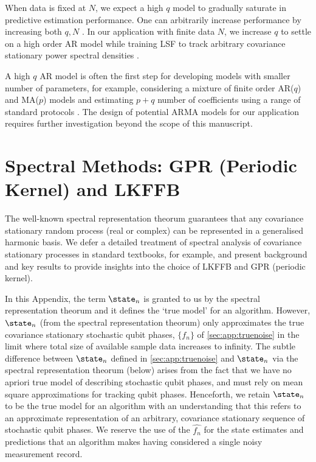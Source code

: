When data is fixed at $N$, we expect a high $q$ model to gradually saturate in predictive estimation performance. One can arbitrarily increase performance by increasing both $q, N$ \cite{wahlberg1989estimation}.  In our application with finite data $N$, we increase $q$ to settle on a high order AR model while training LSF to track arbitrary covariance stationary power spectral densities \cite{brockwell1996introduction}.

A high $q$ AR model is often the first step for developing models with smaller number of parameters, for example, considering a mixture of finite order AR($q$) and MA($p$) models and estimating $p+q$ number of coefficients using a range of standard protocols \cite{brockwell1996introduction,west1996bayesian}. The design of potential ARMA models for our application requires further investigation beyond the scope of this manuscript.




\clearpage
\section{Spectral Methods: GPR (Periodic Kernel) and LKFFB} \label{sec:app:spec_methods}

 The well-known spectral representation theorum  guarantees that any covariance stationary random process (real or complex) can be represented in a generalised harmonic basis.  We defer a detailed treatment of spectral analysis of covariance stationary processes in standard textbooks, for example, \cite{hamilton1994time,karlin1975first} and present background and key results to provide insights into the choice of LKFFB and GPR (periodic kernel).

In this Appendix, the term $\state_n $ is granted to us by the spectral representation theorum and it defines the `true model' for an algorithm. However, $\state_n $ (from the spectral representation theorum) only approximates the true covariance stationary stochastic qubit phases, $\{f_n\}$ of \cref{sec:app:truenoise} in the limit where total size of available sample data increases to infinity. The subtle difference between $\state_n$ defined in \cref{sec:app:truenoise} and $\state_n $ via the spectral representation theorum (below) arises from the fact that we have no apriori true model of describing stochastic qubit phases, and must rely on mean square approximations for tracking qubit phases. Henceforth, we retain $\state_n $ to be the true model for an algorithm with an understanding that this refers to an approximate representation of an arbitrary, covariance stationary sequence of stochastic qubit phases. We reserve the use of the $\hat{f_n}$ for the state estimates and predictions that an algorithm makes having considered a single noisy measurement record. 

